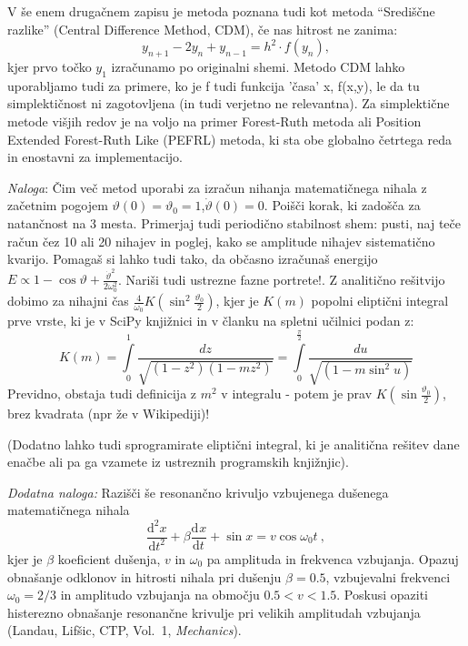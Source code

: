 \documentclass[slovene,11pt,a4paper]{article}
\def\theta{\vartheta}
\newcommand{\ddd}{\mathrm{d}}
\newcommand{\Dd}[3][{}]{\frac{\ddd^{#1} #2}{\ddd #3^{#1}}}
\begin{document}
V še enem drugačnem zapisu je metoda poznana tudi kot metoda ``Središčne razlike'' (Central Difference Method, CDM), če nas hitrost ne zanima:
\[
y_{n+1} - 2 y_n + y_{n-1} = h^2 \cdot f(y_n),
\]
kjer prvo točko $y_1$ izračunamo po originalni shemi. Metodo CDM lahko uporabljamo tudi
za primere, ko je f tudi funkcija 'časa' x, f(x,y), le da tu simplektičnost ni zagotovljena
(in tudi verjetno ne relevantna).
Za simplektične metode višjih redov je na voljo na primer Forest-Ruth metoda ali Position
Extended Forest-Ruth Like (PEFRL) metoda, ki sta obe globalno četrtega reda in enostavni za
implementacijo.

\bigskip

{\it Naloga\/}: Čim več metod uporabi za izračun
nihanja matematičnega nihala z začetnim pogojem  $\theta(0)= \theta_0 = 1$,$\dot{\theta}(0)=0$. 
Poišči korak, ki zadošča za natančnost na 3 mesta. Primerjaj
tudi periodično stabilnost shem: pusti, naj teče račun čez 10
ali 20 nihajev in poglej, kako se amplitude nihajev sistematično
kvarijo. Pomagaš si lahko tudi tako, da občasno izračunaš
energijo $E \propto  1-\cos \theta + \frac{\dot{\theta}^2 }{2 \omega_0^2} $. Nariši tudi
ustrezne fazne portrete!.
Z analitično rešitvijo dobimo za nihajni čas $\frac{4}{\omega_0} K\left(\sin^2\frac{\theta_0}{2}\right)$, kjer je $K(m)$ popolni
eliptični integral prve vrste, ki je v SciPy knjižnici in v članku na spletni učilnici podan z:
\[
K(m)=\int\limits_{0}^{1} \frac{d z}{\sqrt{\left(1-z^{2}\right)\left(1-m z^{2}\right)}} = \int\limits_{0}^{\frac{\pi}{2}} \frac{d u}{\sqrt{\left(1-m \sin^2{u}\right)}}
\] 
Previdno, obstaja tudi definicija z $m^2$ v integralu - potem je prav $K\left(\sin\frac{\theta_0}{2}\right)$, brez kvadrata (npr že v Wikipediji)!

(Dodatno lahko tudi
sprogramirate eliptični integral, ki je analitična rešitev
dane enačbe ali pa ga vzamete iz ustreznih programskih knjižnjic).

\bigskip

{\it Dodatna naloga\/:} Razišči še resonančno krivuljo
vzbujenega dušenega matematičnega nihala
\begin{equation*}
\Dd[2]{x}{t} + \beta\Dd{x}{t}+ \sin x = v\cos\omega_0t\>,
\end{equation*}
kjer je $\beta$ koeficient dušenja, $v$ in $\omega_0$ pa amplituda in
frekvenca vzbujanja.  Opazuj obnašanje odklonov in hitrosti nihala
pri dušenju $\beta=0.5$, vzbujevalni frekvenci $\omega_0=2/3$ in
amplitudo vzbujanja na območju $0.5 < v < 1.5$.
Poskusi opaziti histerezno obnašanje resonančne krivulje pri velikih amplitudah vzbujanja
(Landau, Lifšic, CTP, Vol.~1, {\sl Mechanics\/}).
\end{document}
